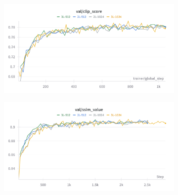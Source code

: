 \begin{figure}[htbp]
  \centering
  \begin{subfigure}[b]{0.48\textwidth}
    \centering
    \includegraphics[width=\textwidth]{images/experiments/cam_depth/clip.png}
    \label{fig:exp_cam_depth_clip}
  \end{subfigure}
  \hfill
  \begin{subfigure}[b]{0.48\textwidth}
    \centering
    \includegraphics[width=\textwidth]{images/experiments/cam_depth/ssim.png}
    \label{fig:exp_cam_depth_ssim}
  \end{subfigure}


\end{figure}
